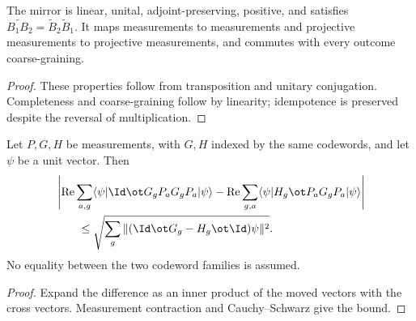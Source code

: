 \begin{lemma}
	\label{lem:pasting-schmidt-mirror-measurement}
	\leanok
	The mirror is linear, unital, adjoint-preserving, positive, and satisfies
	$\widetilde{B_1B_2}=\widetilde B_2\widetilde B_1$.
	It maps measurements to measurements and projective measurements to
	projective measurements, and commutes with every outcome coarse-graining.
\end{lemma}
\begin{proof}
	\leanok
	These properties follow from transposition and unitary conjugation.
	Completeness and coarse-graining follow by linearity; idempotence is
	preserved despite the reversal of multiplication.
\end{proof}

\begin{lemma}
	\label{lem:pasting-distinct-cross-move}
	\leanok
	Let $P,G,H$ be measurements, with $G,H$ indexed by the same codewords,
	and let $\psi$ be a unit vector. Then
	\begin{align*}
	 &\left|\operatorname{Re}\sum_{a,g}\langle\psi|\Id\ot G_gP_aG_gP_a|\psi\rangle
	   -\operatorname{Re}\sum_{g,a}\langle\psi|H_g\ot P_aG_gP_a|\psi\rangle\right|\\
	 &\qquad\leq
	 \sqrt{\sum_g\|(\Id\ot G_g-H_g\ot\Id)\psi\|^2}.
	\end{align*}
	No equality between the two codeword families is assumed.
\end{lemma}
\begin{proof}
	\leanok
	Expand the difference as an inner product of the moved vectors with the
	cross vectors. Measurement contraction and Cauchy--Schwarz give the bound.
\end{proof}

